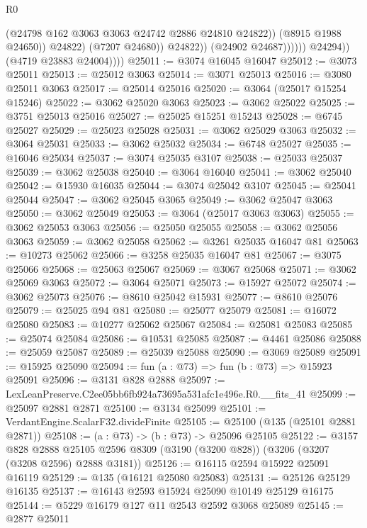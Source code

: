 \begin{lexlean}{R0}
\begin{coremodule}
                                    (@24798 @162 @3063 @3063 @24742 @2886 @24810 @24822))
                                  (@8915 @1988 @24650))
                                @24822)
                              (@7207 @24680))
                            @24822))
                        (@24902 @24687))))))
              @24294))
          (@4719 @23883 @24004))))
@25011 := @3074 @16045 @16047
@25012 := @3073 @25011
@25013 := @25012 @3063
@25014 := @3071 @25013
@25016 := @3080 @25011 @3063
@25017 := @25014 @25016
@25020 := @3064 (@25017 @15254 @15246)
@25022 := @3062 @25020 @3063
@25023 := @3062 @25022
@25025 := @3751 @25013 @25016
@25027 := @25025 @15251 @15243
@25028 := @6745 @25027
@25029 := @25023 @25028
@25031 := @3062 @25029 @3063
@25032 := @3064 @25031
@25033 := @3062 @25032
@25034 := @6748 @25027
@25035 := @16046 @25034
@25037 := @3074 @25035 @3107
@25038 := @25033 @25037
@25039 := @3062 @25038
@25040 := @3064 @16040
@25041 := @3062 @25040
@25042 := @15930 @16035
@25044 := @3074 @25042 @3107
@25045 := @25041 @25044
@25047 := @3062 @25045 @3065
@25049 := @3062 @25047 @3063
@25050 := @3062 @25049
@25053 := @3064 (@25017 @3063 @3063)
@25055 := @3062 @25053 @3063
@25056 := @25050 @25055
@25058 := @3062 @25056 @3063
@25059 := @3062 @25058
@25062 := @3261 @25035 @16047 @81
@25063 := @10273 @25062
@25066 := @3258 @25035 @16047 @81
@25067 := @3075 @25066
@25068 := @25063 @25067
@25069 := @3067 @25068
@25071 := @3062 @25069 @3063
@25072 := @3064 @25071
@25073 := @15927 @25072
@25074 := @3062 @25073
@25076 := @8610 @25042 @15931
@25077 := @8610 @25076
@25079 := @25025 @94 @81
@25080 := @25077 @25079
@25081 := @16072 @25080
@25083 := @10277 @25062 @25067
@25084 := @25081 @25083
@25085 := @25074 @25084
@25086 := @10531 @25085
@25087 := @4461 @25086
@25088 := @25059 @25087
@25089 := @25039 @25088
@25090 := @3069 @25089
@25091 := @15925 @25090
@25094 := fun (a : @73) => fun (b : @73) => @15923 @25091
@25096 := @3131 @828 @2888
@25097 := LexLeanPreserve.C2ee05bb6fb924a73695a531afc1e496e.R0.__fits_41
@25099 := @25097 @2881 @2871
@25100 := @3134 @25099
@25101 := VerdantEngine.ScalarF32.divideFinite
@25105 := @25100 (@135 (@25101 @2881 @2871))
@25108 := (a : @73) -> (b : @73) -> @25096 @25105
@25122 := @3157
    @828
    @2888
    @25105
    @2596
    @8309
    (@3190 (@3200 @828))
    (@3206 (@3207 (@3208 @2596) @2888 @3181))
@25126 := @16115 @2594 @15922 @25091 @16119
@25129 := @135 (@16121 @25080 @25083)
@25131 := @25126 @25129 @16135
@25137 := @16143 @2593 @15924 @25090 @10149 @25129 @16175
@25144 := @5229 @16179 @127 @11 @2543 @2592 @3068 @25089
@25145 := @2877 @25011

\end{coremodule}
\end{lexlean}
